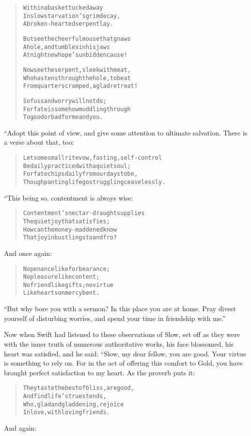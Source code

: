 \documentclass[article, twoside, 14pt]{memoir}
\renewenvironment{verbatim}{%
\begin{quote}%
\vskip -10pt%
\begin{alltt}\normalfont\large}{\end{alltt}%
\end{quote}%
\vskip -10pt
} %
\begin{document}
\begin{verbatim}
Within a basket tucked away
In slow starvation's grim decay,
A broken-hearted serpent lay.

But see the cheerful mouse that gnaws
A hole, and tumbles in his jaws
At night{\textemdash}new hope's unbidden cause!

Now see the serpent, sleek with meat,
Who hastens through the hole, to beat
From quarters cramped, a glad retreat!

So fuss and worry will not do;
For fate is somehow muddling through
To good or bad for me and you.
\end{verbatim}
“Adopt this point of view, and give some attention to ultimate
salvation. There is a verse about that, too:

\begin{verbatim}
Let some small rite{\textemdash}vow, fasting, self-control{\textemdash}
Be daily practiced with a quiet soul;
For fate chips daily from our days to be,
Though panting life go struggling ceaselessly.
\end{verbatim}
“This being so, contentment is always wise:

\begin{verbatim}
Contentment's nectar-draught supplies
The quiet joy that satisfies;
How can the money-maddened know
That joy in bustlings to and fro?
\end{verbatim}
And once again:

\begin{verbatim}
No penance like forbearance;
    No pleasure like content;
No friend like gifts; no virtue
    Like hearts on mercy bent.
\end{verbatim}
``But why bore you with a sermon? In this place you are at home. Pray divest yourself of disturbing worries, and spend your time in friendship with me.''

Now when Swift had listened to these observations of Slow, set off
as they were with the inner truth of numerous authoritative works,
his face blossomed, his heart was satisfied, and he said: “Slow, my
dear fellow, you are good. Your virtue is something to rely on. For
in the act of offering this comfort to Gold, you have brought
perfect satisfaction to my heart. As the proverb puts it:

\begin{verbatim}
They taste the best of bliss, are good,
    And find life's truest ends,
Who, glad and gladdening, rejoice
    In love, with loving friends.
\end{verbatim}
And again:
\end{document}

